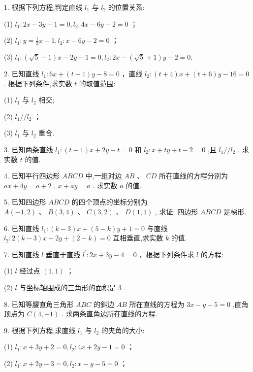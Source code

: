 \documentclass[10pt]{article}
\begin{document}
1. 根据下列方程,判定直线 \({l}_{1}\) 与 \({l}_{2}\) 的位置关系:

(1) \({l}_{1} : {2x} - {3y} - 1 = 0,{l}_{2} : {4x} - {6y} - 2 = 0\) ；

(2) \({l}_{1} : y = \frac{1}{3}x + 1,{l}_{2} : x - {6y} - 2 = 0\) ；

(3) \({l}_{1} : \left( {\sqrt{5} - 1}\right) x - {2y} + 1 = 0,{l}_{2} : {2x} - \left( {\sqrt{5} + 1}\right) y - 2 = 0.\)

2. 已知直线 \({l}_{1} : {6x} + \left( {t - 1}\right) y - 8 = 0\) ，直线 \({l}_{2} : \left( {t + 4}\right) x + \left( {t + 6}\right) y - {16} = 0\) . 根据下列条件,求实数 \(t\) 的取值范围:

(1) \({l}_{1}\) 与 \({l}_{2}\) 相交;

(2) \({l}_{1}//{l}_{2}\) ；

(3) \({l}_{1}\) 与 \({l}_{2}\) 重合.

3. 已知两条直线 \({l}_{1} : \left( {t - 1}\right) x + {2y} - t = 0\) 和 \({l}_{2} : x + {ty} + t - 2 = 0\) ,且 \({l}_{1}//{l}_{2}\) . 求实数 \(t\) 的值.

4. 已知平行四边形 \({ABCD}\) 中,一组对边 \({AB}\text{ 、 }{CD}\) 所在直线的方程分别为 \({ax} + {4y} = a + 2\) , \(x + {ay} = a\) . 求实数 \(a\) 的值.

5. 已知四边形 \({ABCD}\) 的四个顶点的坐标分别为 \(A\left( {-1,2}\right) \text{ 、 }B\left( {3,4}\right) \text{ 、 }C\left( {3,2}\right) \text{ 、 }D\left( {1,1}\right)\) , 求证: 四边形 \({ABCD}\) 是梯形.

6. 已知直线 \({l}_{1} : \left( {k - 3}\right) x + \left( {5 - k}\right) y + 1 = 0\) 与直线 \({l}_{2} : 2\left( {k - 3}\right) x - {2y} + \left( {2 - k}\right)  = 0\) 互相垂直,求实数 \(k\) 的值.

7. 已知直线 \(l\) 垂直于直线 \({l}^{\prime } : {2x} + {3y} - 4 = 0\) ，根据下列条件求 \(l\) 的方程:

(1) \(l\) 经过点 \(\left( {1,1}\right)\) ；

(2) \(l\) 与坐标轴围成的三角形的面积是 3 .

8. 已知等腰直角三角形 \({ABC}\) 的斜边 \({AB}\) 所在直线的方程为 \({3x} - y - 5 = 0\) ,直角顶点为 \(C\left( {4, - 1}\right)\) . 求两条直角边所在直线的方程.

9. 根据下列方程,求直线 \({l}_{1}\) 与 \({l}_{2}\) 的夹角的大小:

(1) \({l}_{1} : {x + {3y} + 2} = 0,{l}_{2} : {{4x} + {2y} - 1} = 0\) ；

(2) \({l}_{1} : {x + {2y} - 3} = 0,{l}_{2} : {x - y - 5} = 0\) ；
\end{document}
